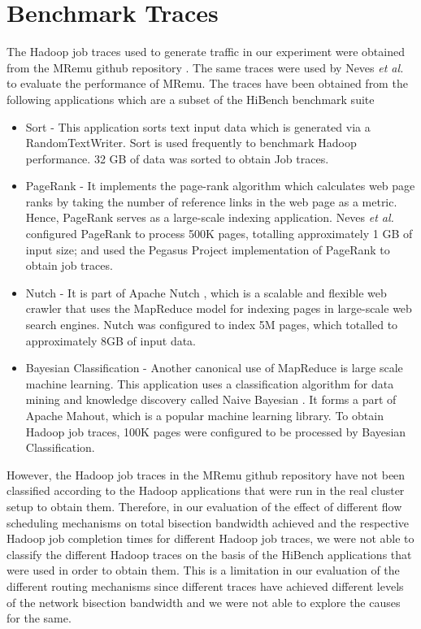 \section{Benchmark Traces} \label{sec:BenchTraces}

The Hadoop job traces used to generate traffic in our experiment were obtained from the MRemu github repository \cite{MRemuRepo2015}. The same traces were used by Neves \textit{et al.} \cite{neves2015mremu} to evaluate the performance of MRemu. The traces have been obtained from the following applications which are a subset of the HiBench benchmark suite \cite{huang2011hibench}
\begin{itemize}
	\item Sort - This application sorts text input data which is generated via a RandomTextWriter. Sort is used frequently to benchmark Hadoop performance. 32 GB of data was sorted to obtain Job traces.
	\item PageRank - It implements the page-rank \cite{huang2011hibench} algorithm which calculates web page ranks by taking the number of reference links in the web page as a metric. Hence, PageRank serves as a large-scale indexing application. Neves \textit{et al.} configured PageRank to process 500K pages, totalling approximately 1 GB of input size; and used the Pegasus Project \cite{kang2009pegasus} implementation of PageRank to obtain job traces.  
	\item Nutch - It is part of Apache Nutch \cite{NutchWeb}, which is a scalable and flexible web crawler that uses the MapReduce model for indexing pages in  large-scale web search engines. Nutch was configured to index 5M pages, which totalled to approximately 8GB of input data.
	\item Bayesian Classification - Another canonical use of MapReduce is large scale machine learning. This application uses a classification algorithm for data mining and knowledge discovery called Naive Bayesian \cite{huang2011hibench}. It forms a part of Apache Mahout, which is a popular machine learning library. To obtain Hadoop job traces, 100K pages were configured to be processed by Bayesian Classification.
\end{itemize}

However, the Hadoop job traces in the MRemu github repository \cite{MRemuRepo2015} have not been classified according to the Hadoop applications that were run in the real cluster setup to obtain them. Therefore, in our evaluation of the effect of different flow scheduling mechanisms on total bisection bandwidth achieved and the respective Hadoop job completion times for different Hadoop job traces, we were not able to classify the different Hadoop traces on the basis of the HiBench applications that were used in order to obtain them. This is a limitation in our evaluation of the different routing mechanisms since different traces have achieved different levels of the network bisection bandwidth and we were not able to explore the causes for the same.    

